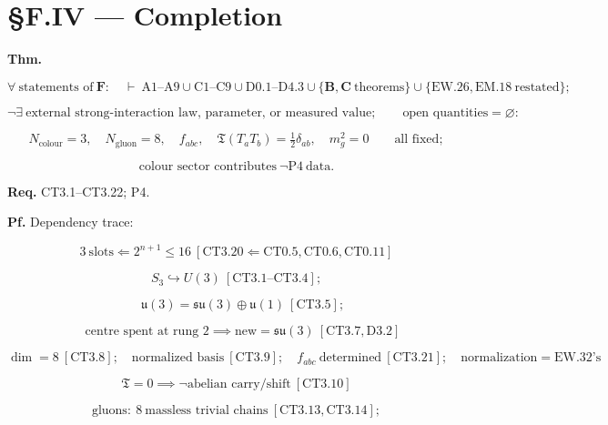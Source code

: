 \section[§F.IV — Completion]{\texorpdfstring{§F.IV — Completion}{SF.IV - Completion}}

\begin{theorem}\label{tag:CT3-19}
\textbf{Thm.}

\[
\forall\ \text{statements of}\ \mathbf F:\quad\vdash\ \mathrm{A1\text{–}A9}\cup\mathrm{C1\text{–}C9}\cup\mathrm{D0.1\text{–}D4.3}\cup\{\mathbf B,\mathbf C\ \text{theorems}\}\cup\{\mathrm{EW.26},\mathrm{EM.18}\ \text{restated}\};
\]

\[
\neg\exists\ \text{external strong-interaction law, parameter, or measured value};\qquad
\text{open quantities}=\varnothing:
\]

\[
N_{\text{colour}}=3,\quad N_{\mathrm{gluon}}=8,\quad f_{abc},\quad\mathfrak T(T_aT_b)=\tfrac12\delta_{ab},\quad m_g^2=0\qquad\text{all fixed};
\]

\[
\text{colour sector contributes}\ \neg\mathrm{P4}\ \text{data}.
\]

\textbf{Req.} CT3.1–CT3.22; P4.

\textbf{Pf.} Dependency trace:

\[
3\ \text{slots}\Leftarrow2^{n+1}\le16\ [\mathrm{CT3.20}\Leftarrow\mathrm{CT0.5},\mathrm{CT0.6},\mathrm{CT0.11}]
\]

\[
S_3\hookrightarrow U(3)\ [\mathrm{CT3.1}\text{--}\mathrm{CT3.4}];
\]

\[
\quad \mathfrak u(3)=\mathfrak{su}(3)\oplus\mathfrak u(1)\ [\mathrm{CT3.5}];
\]

\[
\quad \text{centre spent at rung 2}\implies\text{new}=\mathfrak{su}(3)\ [\mathrm{CT3.7},\mathrm{D3.2}]
\]

\[
\dim=8\ [\mathrm{CT3.8}];\quad\text{normalized basis}\ [\mathrm{CT3.9}];\quad f_{abc}\ \text{determined}\ [\mathrm{CT3.21}];\quad\text{normalization}=\mathrm{EW.32}\text{'s}
\]

\[
\mathfrak T=0\implies\neg\text{abelian carry/shift}\ [\mathrm{CT3.10}]
\]

\[
\text{gluons}:\ 8\ \text{massless trivial chains}\ [\mathrm{CT3.13},\mathrm{CT3.14}];
\]


\end{theorem}
